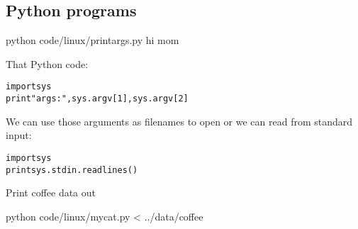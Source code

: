 \begin{fullwidth}
\vspace{5mm}

\section{Python programs}

{\small
\bash[script,stdout,prefix=$]
python code/linux/printargs.py hi mom
\END
}

That Python code:
 
\begin{alltt}
import sys
print "args:", sys.argv[1], sys.argv[2]
\end{alltt}

We can use those arguments as filenames to open or we can read from standard input:
 
\begin{alltt}
import sys
print sys.stdin.readlines()  
\end{alltt}

Print coffee data out

{\small
\bash[script,stdout,prefix=$]
python code/linux/mycat.py < ../data/coffee
\END
}

\end{fullwidth}
